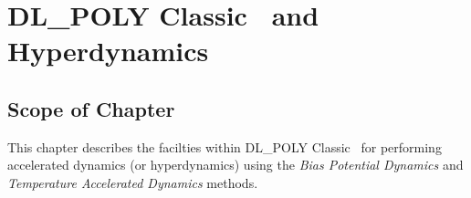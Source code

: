 \documentclass[a4,11pt]{report}
\newcommand{\D}{DL\_POLY Classic~}
\begin{document}
\chapter{\D{} and Hyperdynamics}
\label{hyperdynamics}
\setcounter{equation}{0}
\newpage
\section*{Scope of Chapter}
This chapter describes the facilties within \D{} for performing
accelerated dynamics (or hyperdynamics) using the {\em Bias Potential
Dynamics} and {\em Temperature Accelerated Dynamics} methods.
\newpage

\newpage


\newpage
\printindex
\end{document}
